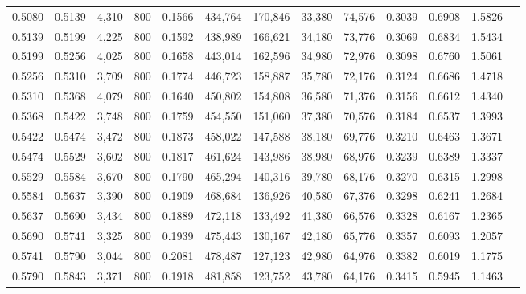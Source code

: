 \begin{tabular}{rrrrrrrrrrrrr}
0.5080 & 0.5139 &  4,310 &   800 &                                     0.1566 & 434,764 & 170,846 &  33,380 &  74,576 & 0.3039 & 0.6908 & 1.5826 \\
0.5139 & 0.5199 &  4,225 &   800 &                                     0.1592 & 438,989 & 166,621 &  34,180 &  73,776 & 0.3069 & 0.6834 & 1.5434 \\
0.5199 & 0.5256 &  4,025 &   800 &                                     0.1658 & 443,014 & 162,596 &  34,980 &  72,976 & 0.3098 & 0.6760 & 1.5061 \\
0.5256 & 0.5310 &  3,709 &   800 &                                     0.1774 & 446,723 & 158,887 &  35,780 &  72,176 & 0.3124 & 0.6686 & 1.4718 \\
0.5310 & 0.5368 &  4,079 &   800 &                                     0.1640 & 450,802 & 154,808 &  36,580 &  71,376 & 0.3156 & 0.6612 & 1.4340 \\
0.5368 & 0.5422 &  3,748 &   800 &                                     0.1759 & 454,550 & 151,060 &  37,380 &  70,576 & 0.3184 & 0.6537 & 1.3993 \\
0.5422 & 0.5474 &  3,472 &   800 &                                     0.1873 & 458,022 & 147,588 &  38,180 &  69,776 & 0.3210 & 0.6463 & 1.3671 \\
0.5474 & 0.5529 &  3,602 &   800 &                                     0.1817 & 461,624 & 143,986 &  38,980 &  68,976 & 0.3239 & 0.6389 & 1.3337 \\
0.5529 & 0.5584 &  3,670 &   800 &                                     0.1790 & 465,294 & 140,316 &  39,780 &  68,176 & 0.3270 & 0.6315 & 1.2998 \\
0.5584 & 0.5637 &  3,390 &   800 &                                     0.1909 & 468,684 & 136,926 &  40,580 &  67,376 & 0.3298 & 0.6241 & 1.2684 \\
0.5637 & 0.5690 &  3,434 &   800 &                                     0.1889 & 472,118 & 133,492 &  41,380 &  66,576 & 0.3328 & 0.6167 & 1.2365 \\
0.5690 & 0.5741 &  3,325 &   800 &                                     0.1939 & 475,443 & 130,167 &  42,180 &  65,776 & 0.3357 & 0.6093 & 1.2057 \\
0.5741 & 0.5790 &  3,044 &   800 &                                     0.2081 & 478,487 & 127,123 &  42,980 &  64,976 & 0.3382 & 0.6019 & 1.1775 \\
0.5790 & 0.5843 &  3,371 &   800 &                                     0.1918 & 481,858 & 123,752 &  43,780 &  64,176 & 0.3415 & 0.5945 & 1.1463 \\

\end{tabular}
